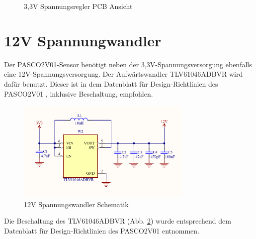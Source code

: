 \begin{inhalt}
\begin{figure}[H]
  \caption{3,3V Spannungsregler PCB Ansicht}
  \label{fig:pcb_layers}
\end{figure}








      \section{12V Spannungwandler}
      
Der PASCO2V01-Sensor benötigt neben der 3,3V-Spannungsversorgung ebenfalls eine 12V-Spannungsversorgung. Der Aufwärtswandler TLV61046ADBVR \cite{TLV61046} wird dafür benutzt. Dieser ist in dem Datenblatt für Design-Richtlinien des PASCO2V01 \cite{PASCO2_Design_Guidelines}, inklusive Beschaltung, empfohlen.


\begin{figure}[!htb]
\centering
\includegraphics[width=0.75\textwidth]{files/Tobias/pics/Schaltungen/Schematik/12V_Converter_Schematik.PNG}
\caption[12V Spannungswandler Schematik]{12V Spannungswandler Schematik}
\label{fig:12V Spannungswandler Schematik}
\end{figure}

Die Beschaltung des TLV61046ADBVR (Abb. \ref{fig:12V Spannungswandler Schematik}) wurde entsprechend dem Datenblatt für Design-Richtlinien des PASCO2V01 \cite{PASCO2_Design_Guidelines} entnommen. 


\begin{figure}[H] 
  \centering


\end{figure}
\end{inhalt}
